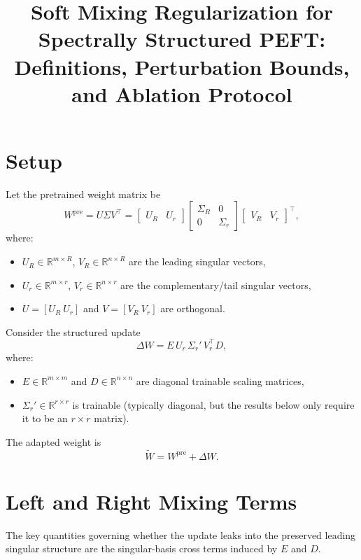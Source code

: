 \documentclass[11pt]{article}
\title{Soft Mixing Regularization for Spectrally Structured PEFT:\\
Definitions, Perturbation Bounds, and Ablation Protocol}
\author{}
\date{}
\newcommand{\R}{\mathbb{R}}
\begin{document}
\maketitle

\section{Setup}

Let the pretrained weight matrix be
\[
W^{\mathrm{pre}} = U \Sigma V^\top
=
\begin{bmatrix} U_R & U_r \end{bmatrix}
\begin{bmatrix}
\Sigma_R & 0\\
0 & \Sigma_r
\end{bmatrix}
\begin{bmatrix} V_R & V_r \end{bmatrix}^\top,
\]
where:
\begin{itemize}[leftmargin=2em]
    \item \(U_R \in \R^{m\times R}\), \(V_R \in \R^{n\times R}\) are the leading singular vectors,
    \item \(U_r \in \R^{m\times r}\), \(V_r \in \R^{n\times r}\) are the complementary/tail singular vectors,
    \item \(U=[U_R\ U_r]\) and \(V=[V_R\ V_r]\) are orthogonal.
\end{itemize}

Consider the structured update
\[
\Delta W = E\,U_r\,\Sigma_r' \,V_r^\top D,
\]
where:
\begin{itemize}[leftmargin=2em]
    \item \(E\in\R^{m\times m}\) and \(D\in\R^{n\times n}\) are diagonal trainable scaling matrices,
    \item \(\Sigma_r' \in \R^{r\times r}\) is trainable (typically diagonal, but the results below only require it to be an \(r\times r\) matrix).
\end{itemize}

The adapted weight is
\[
\widetilde W = W^{\mathrm{pre}} + \Delta W.
\]

\section{Left and Right Mixing Terms}

The key quantities governing whether the update leaks into the preserved leading singular structure are the singular-basis cross terms induced by \(E\) and \(D\).
\end{document}
